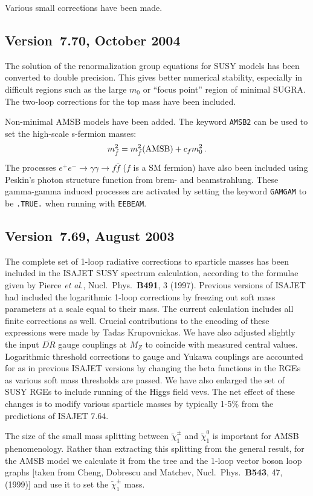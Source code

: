 Various small corrections have been made.

\subsection{Version~7.70, October 2004}

The solution of the renormalization group equations for SUSY models has
been converted to double precision. This gives better numerical
stability, especially in difficult regions such as the large $m_0$ or
``focus point'' region of minimal SUGRA. The two-loop corrections for
the top mass have been included.

Non-minimal AMSB models have been added. The keyword \verb|AMSB2| can be
used to set the high-scale s-fermion masses:
$$
m_{\tilde f}^2=m_{\tilde f}^2({\rm AMSB})+c_f m_0^2\,.
$$
The processes $e^+e^-\to\gamma\gamma\to f\bar{f}$ ($f$ is a SM fermion)
have also been included using Peskin's photon structure function from
brem- and beamstrahlung. These gamma-gamma induced processes are
activated by setting the keyword \verb|GAMGAM| to be \verb|.TRUE.| when
running with \verb|EEBEAM|.

\subsection{Version~7.69, August 2003}

The complete set of 1-loop radiative corrections to sparticle masses has
been included in the ISAJET SUSY spectrum calculation, according to the
formulae given by Pierce {\it et al.}, Nucl.\ Phys.\ {\bf B491}, 3
(1997).  Previous versions of ISAJET had included the logarithmic 1-loop
corrections by freezing out soft mass parameters at a scale equal to
their mass. The current calculation includes all finite corrections as
well. Crucial contributions to the encoding of these expressions were
made by Tadas Krupovnickas. We have also adjusted slightly the input
$\overline{DR}$ gauge couplings at $M_Z$ to coincide with measured
central values.  Logarithmic threshold corrections to gauge and Yukawa
couplings are accounted for as in previous ISAJET versions by changing
the beta functions in the RGEs as various soft mass thresholds are
passed. We have also enlarged the set of SUSY RGEs to include running
of the Higgs field vevs. The net effect of these changes is to modify
various sparticle masses by typically 1-5\% from the predictions of
ISAJET 7.64.

The size of the small mass splitting between $\tilde\chi_1^\pm$ and
$\tilde\chi_1^0$ is important for AMSB phenomenology. Rather than
extracting this splitting from the general result, for the AMSB model we
calculate it from the tree and the 1-loop vector boson loop graphs
[taken from Cheng, Dobrescu and Matchev, Nucl.\ Phys.\ {\bf B543}, 47,
(1999)] and use it to set the $\tilde\chi_1^\pm$ mass.

